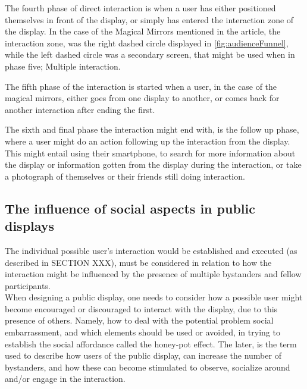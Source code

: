     The fourth phase of direct interaction is when a user has either positioned themselves in front of the display, or simply has entered the interaction zone of the display. In the case of the Magical Mirrors mentioned in the article\cite{interactivePublicDisplays}, the interaction zone, was the right dashed circle displayed in \autoref{fig:audienceFunnel}, while the left dashed circle was a secondary screen, that might be used when in phase five; Multiple interaction.
    
    The fifth phase of the interaction is started when a user, in the case of the magical mirrors, either goes from one display to another, or comes back for another interaction after ending the first\cite{interactivePublicDisplays}.
    
    The sixth and final phase the interaction might end with, is the follow up phase, where a user might do an action following up the interaction from the display. This might entail using their smartphone, to search for more information about the display or information gotten from the display during the interaction, or take a photograph of themselves or their friends still doing interaction\cite{interactivePublicDisplays}. 
    
\subsection{The influence of social aspects in public displays} %
The individual possible user's interaction would be established and executed (as described in SECTION XXX), must be considered in relation to how the interaction might be influenced by the presence of multiple bystanders and fellow participants. \\
When designing a public display, one needs to consider how a possible user might become encouraged or discouraged to interact with the display, due to this presence of others. Namely, how to deal with the potential problem social embarrassment, and which elements should be used or avoided, in trying to establish the social affordance called the honey-pot effect. The later, is the term used to describe how users of the public display, can increase the number of bystanders, and how these can become stimulated to observe, socialize around and/or engage in the interaction.\\

